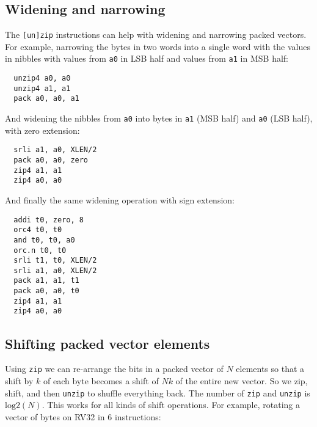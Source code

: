 
\subsection{Widening and narrowing}

The {\tt [un]zip} instructions can help with widening and narrowing packed
vectors. For example, narrowing the bytes in two words into a single
word with the values in nibbles with values from {\tt a0} in LSB half and
values from {\tt a1} in MSB half:

\begin{minipage}{\linewidth}
\begin{verbatim}
  unzip4 a0, a0
  unzip4 a1, a1
  pack a0, a0, a1
\end{verbatim}
\end{minipage}

And widening the nibbles from {\tt a0} into bytes in {\tt a1} (MSB half)
and {\tt a0} (LSB half), with zero extension:

\begin{minipage}{\linewidth}
\begin{verbatim}
  srli a1, a0, XLEN/2
  pack a0, a0, zero
  zip4 a1, a1
  zip4 a0, a0
\end{verbatim}
\end{minipage}

And finally the same widening operation with sign extension:

\begin{minipage}{\linewidth}
\begin{verbatim}
  addi t0, zero, 8
  orc4 t0, t0
  and t0, t0, a0
  orc.n t0, t0
  srli t1, t0, XLEN/2
  srli a1, a0, XLEN/2
  pack a1, a1, t1
  pack a0, a0, t0
  zip4 a1, a1
  zip4 a0, a0
\end{verbatim}
\end{minipage}


\subsection{Shifting packed vector elements}

Using {\tt zip} we can re-arrange the bits in a packed vector of $N$ elements
so that a shift by $k$ of each byte becomes a shift of $Nk$ of the entire new
vector. So we zip, shift, and then {\tt unzip} to shuffle everything back. The number
of {\tt zip} and {\tt unzip} is $\textrm{log}2(N)$. This works for all kinds of
shift operations. For example, rotating a vector of bytes on RV32 in 6
instructions:

